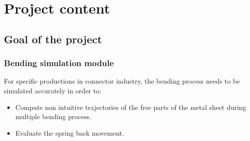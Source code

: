 \documentclass{beamer}
\begin{document}
\section{Project content}
\subsection{Goal of the project}
\begin{frame}
    \frametitle{Bending simulation module}
    For specific productions in connector industry, the bending process needs to be simulated accurately in order to:
    \begin{itemize}
        \item Compute non intuitive trajectories of the free parts of the metal sheet during multiple bending process.
        \item Evaluate the spring back movement.
    \end{itemize}
\end{frame}
\end{document}
